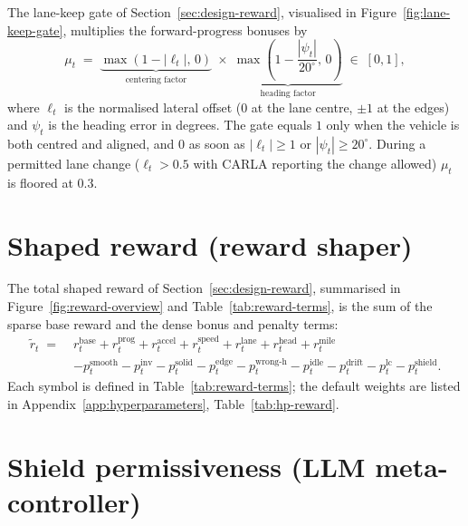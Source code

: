 The lane-keep gate of Section~\ref{sec:design-reward}, visualised in
Figure~\ref{fig:lane-keep-gate}, multiplies the forward-progress bonuses by
\begin{equation}
  \mu_t \;=\;
  \underbrace{\max(1 - |\ell_t|,\, 0)}_{\text{centering factor}}
  \;\times\;
  \underbrace{\max\!\left(1 - \frac{|\psi_t|}{20^\circ},\, 0\right)}_{\text{heading factor}}
  \;\in\;[0,1],
  \label{eq:lane-keep-gate}
\end{equation}
where \(\ell_t\) is the normalised lateral offset (\(0\) at the lane centre, \(\pm1\) at the edges)
and \(\psi_t\) is the heading error in degrees. The gate equals \(1\) only when the vehicle is both
centred and aligned, and \(0\) as soon as \(|\ell_t|\geq1\) or \(|\psi_t|\geq20^\circ\). During a
permitted lane change (\(\ell_t>0.5\) with CARLA reporting the change allowed) \(\mu_t\) is floored
at \(0.3\).

\section{Shaped reward (reward shaper)}\label{app:math-reward}

The total shaped reward of Section~\ref{sec:design-reward}, summarised in
Figure~\ref{fig:reward-overview} and Table~\ref{tab:reward-terms}, is the sum of the sparse base
reward and the dense bonus and penalty terms:
\begin{equation}\label{eq:shaped-reward}
  \begin{split}
  \tilde{r}_t \;=\;{} & r^{\mathrm{base}}_t
    + r^{\mathrm{prog}}_t + r^{\mathrm{accel}}_t + r^{\mathrm{speed}}_t
    + r^{\mathrm{lane}}_t + r^{\mathrm{head}}_t + r^{\mathrm{mile}}_t \\
    & - p^{\mathrm{smooth}}_t - p^{\mathrm{inv}}_t - p^{\mathrm{solid}}_t
      - p^{\mathrm{edge}}_t - p^{\mathrm{wrong\text{-}h}}_t
      - p^{\mathrm{idle}}_t - p^{\mathrm{drift}}_t
      - p^{\mathrm{lc}}_t - p^{\mathrm{shield}}_t.
  \end{split}
\end{equation}
Each symbol is defined in Table~\ref{tab:reward-terms}; the default weights are listed in
Appendix~\ref{app:hyperparameters}, Table~\ref{tab:hp-reward}.

\section{Shield permissiveness (LLM meta-controller)}\label{app:math-permissiveness}

